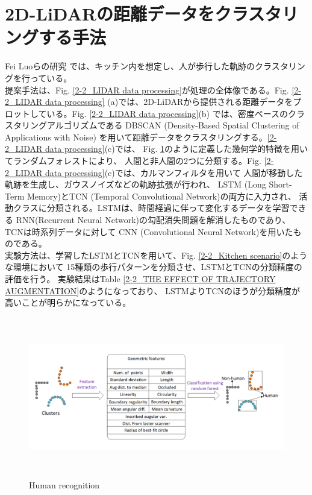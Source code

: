 \section{2D-LiDARの距離データをクラスタリングする手法}
Fei Luoらの研究\cite{Temporal convolutional networks for multi-person activity recognition using a 2D LIDAR}
では、キッチン内を想定し、人が歩行した軌跡のクラスタリングを行っている。\\ \indent
提案手法は、Fig. \ref{2-2_LIDAR data processing}が処理の全体像である。Fig. \ref{2-2_LIDAR data processing}
(a)では、2D-LiDARから提供される距離データをプロットしている。Fig. \ref{2-2_LIDAR data processing}(b)
では、密度ベースのクラスタリングアルゴリズムである
DBSCAN (Density-Based Spatial Clustering of Applications with Noise)
を用いて距離データをクラスタリングする。\ref{2-2_LIDAR data processing}(c)では、
Fig. \ref{2-2_Human recognition}のように定義した幾何学的特徴を用いてランダムフォレストにより、
人間と非人間の2つに分類する。Fig. \ref{2-2_LIDAR data processing}(c)では、カルマンフィルタを用いて
人間が移動した軌跡を生成し、ガウスノイズなどの軌跡拡張が行われ、
LSTM (Long Short-Term Memory)とTCN (Temporal Convolutional Network)の両方に入力され、
活動クラスに分類される。LSTMは、時間経過に伴って変化するデータを学習できる
RNN(Recurrent Neural Network)の勾配消失問題を解消したものであり、TCNは時系列データに対して
CNN (Convolutional Neural Network)を用いたものである。\\ \indent
実験方法は、学習したLSTMとTCNを用いて、Fig. \ref{2-2_Kitchen scenario}のような環境において
15種類の歩行パターンを分類させ、LSTMとTCNの分類精度の評価を行う。
実験結果はTable \ref{2-2_THE EFFECT OF TRAJECTORY AUGMENTATION}のようになっており、
LSTMよりTCNのほうが分類精度が高いことが明らかになっている。

\begin{figure}[h]
  \begin{center}
  \includegraphics[height=70mm,clip]{figure/2-2_Human-recognition.png}
  \caption{Human recognition\cite{Temporal convolutional networks for multi-person activity recognition using a 2D LIDAR}}
  \label{2-2_Human recognition}
  \end{center}
\end{figure}

